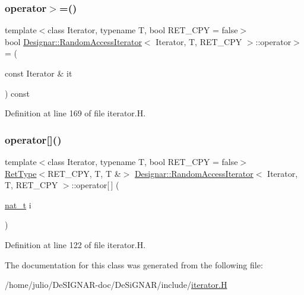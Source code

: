 \subsubsection{\texorpdfstring{operator$>$=()}{operator>=()}}
{\footnotesize\ttfamily template$<$class Iterator, typename T, bool R\+E\+T\+\_\+\+C\+PY = false$>$ \\
bool \hyperlink{class_designar_1_1_random_access_iterator}{Designar\+::\+Random\+Access\+Iterator}$<$ Iterator, T, R\+E\+T\+\_\+\+C\+PY $>$\+::operator$>$= (\begin{DoxyParamCaption}\item[{const Iterator \&}]{it }\end{DoxyParamCaption}) const\hspace{0.3cm}{\ttfamily [inline]}}



Definition at line 169 of file iterator.\+H.

\mbox{\label{class_designar_1_1_random_access_iterator_a19e24a37b546cb41aed275ff61fbc0b7}} 
\subsubsection{\texorpdfstring{operator[]()}{operator[]()}}
{\footnotesize\ttfamily template$<$class Iterator, typename T, bool R\+E\+T\+\_\+\+C\+PY = false$>$ \\
\hyperlink{namespace_designar_ab937f9c4bf5f1d0e65dbc616245d50ee}{Ret\+Type}$<$R\+E\+T\+\_\+\+C\+PY, T, T \&$>$ \hyperlink{class_designar_1_1_random_access_iterator}{Designar\+::\+Random\+Access\+Iterator}$<$ Iterator, T, R\+E\+T\+\_\+\+C\+PY $>$\+::operator\mbox{[}$\,$\mbox{]} (\begin{DoxyParamCaption}\item[{\hyperlink{namespace_designar_aa72662848b9f4815e7bf31a7cf3e33d1}{nat\+\_\+t}}]{i }\end{DoxyParamCaption})\hspace{0.3cm}{\ttfamily [inline]}}



Definition at line 122 of file iterator.\+H.



The documentation for this class was generated from the following file\+:\begin{DoxyCompactItemize}
\item 
/home/julio/\+De\+S\+I\+G\+N\+A\+R-\/doc/\+De\+Si\+G\+N\+A\+R/include/\hyperlink{iterator_8_h}{iterator.\+H}\end{DoxyCompactItemize}
